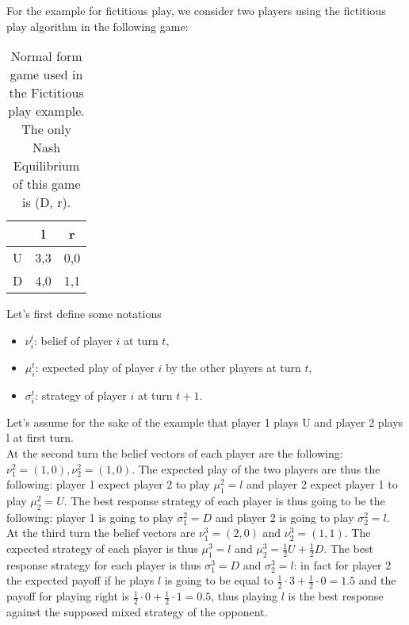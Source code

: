 \begin{example}
\label{ex:fictitiousPlay}
For the example for fictitious play, we consider two players using the
fictitious play algorithm in the following game:

\begin{table}
    \centering
    \begin{tabular}{c|cc}
        & l & r \\
        \hline
        U & 3,3 & 0,0 \\
        D & 4,0 & 1,1 \\
    \end{tabular}
    \caption{Normal form game used in the Fictitious play example. The only
    Nash Equilibrium of this game is (D, r).}
\end{table}

Let's first define some notations 
\begin{itemize}
        \item $\nu_i^t$: belief of player $i$ at turn $t$,
        \item $\mu_i^t$: expected play of player $i$ by the other players at turn $t$,
        \item $\sigma_i^t$: strategy of player $i$ at turn $t+1$.
\end{itemize}

Let's assume for the sake of the example that player 1 plays U and player 2
plays l at first turn.\\

At the second turn the belief vectors of each player are the following:
$\nu_1^2=(1,0), \nu_2^2=(1,0)$. The expected play of the two players are
thus the following: player 1 expect player 2 to play $\mu_1^2=l$ and player
2 expect player 1 to play $\mu_2^2=U$. The best response strategy of each
player is thus going to be the following: player 1 is going to play
$\sigma_1^2=D$ and player 2 is going to play $\sigma_2^2=l$.\\

At the third turn the belief vectors are $\nu_1^3=(2,0)$ and $\nu_2^3=(1,1)$.
The expected strategy of each player is thus $\mu_1^3=l$ and
$\mu_2^3=\frac{1}{2}U+\frac{1}{2}D$. The best response strategy for each
player is thus $\sigma_1^3=D$ and $\sigma_2^3=l$: in fact for player 2 the
expected payoff if  he plays $l$ is going to be equal to
$\frac{1}{2}\cdot3+\frac{1}{2}\cdot0=1.5$ and the payoff for playing right is
$\frac{1}{2}\cdot0+\frac{1}{2}\cdot1=0.5$, thus playing $l$ is the best response
against the supposed mixed strategy of the opponent.\\


\end{example}
